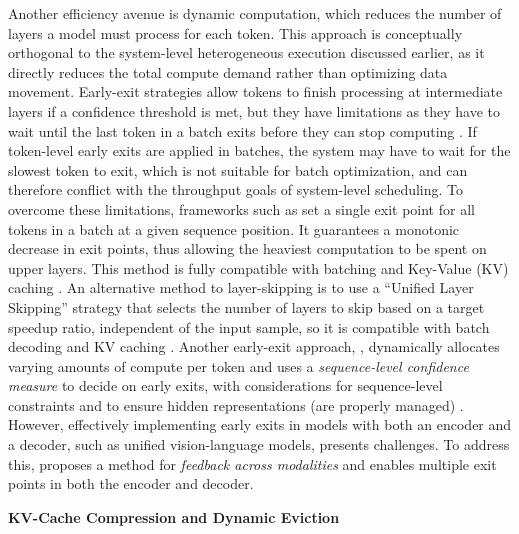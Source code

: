 \documentclass[11pt]{article}
\begin{document}
Another efficiency avenue is dynamic computation, which reduces the number of layers a model must process for each token. This approach is conceptually orthogonal to the system-level heterogeneous execution discussed earlier, as it directly reduces the total compute demand rather than optimizing data movement. Early-exit strategies allow tokens to finish processing at intermediate layers if a confidence threshold is met, but they have limitations as they have to wait until the last token in a batch exits before they can stop computing \cite{ref329}. If token-level early exits are applied in batches, the system may have to wait for the slowest token to exit, which is not suitable for batch optimization, and can therefore conflict with the throughput goals of system-level scheduling. To overcome these limitations, frameworks such as \cite{ref330} set a single exit point for all tokens in a batch at a given sequence position. It guarantees a monotonic decrease in exit points, thus allowing the heaviest computation to be spent on upper layers. This method is fully compatible with batching and Key-Value (KV) caching \cite{ref329}. An alternative method to layer-skipping is to use a ``Unified Layer Skipping'' strategy that selects the number of layers to skip based on a target speedup ratio, independent of the input sample, so it is compatible with batch decoding and KV caching \cite{ref331}. Another early-exit approach, \cite{ref332}, dynamically allocates varying amounts of compute per token and uses a \emph{sequence-level confidence measure} to decide on early exits, with considerations for sequence-level constraints and to ensure hidden representations (are properly managed) \cite{ref332}. However, effectively implementing early exits in models with both an encoder and a decoder, such as unified vision-language models, presents challenges. To address this, \cite{ref333} proposes a method for \emph{feedback across modalities} and enables multiple exit points in both the encoder and decoder.

\textbf{KV-Cache Compression and Dynamic Eviction}
\end{document}
